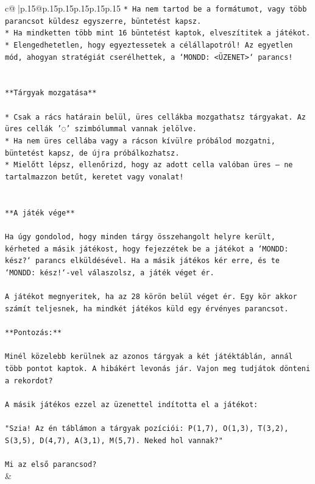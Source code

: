\documentclass{article}
\begin{document}
{\begin{supertabular}{c@{$\;$}|p{.15\linewidth}@{}p{.15\linewidth}p{.15\linewidth}p{.15\linewidth}p{.15\linewidth}p{.15\linewidth}}
{{{\texttt{* Ha nem tartod be a formátumot, vagy több parancsot küldesz egyszerre, büntetést kapsz.} \\
\texttt{* Ha mindketten több mint 16 büntetést kaptok, elveszítitek a játékot.} \\
\texttt{* Elengedhetetlen, hogy egyeztessetek a célállapotról! Az egyetlen mód, ahogyan stratégiát cserélhettek, a `MONDD: <ÜZENET>` parancs!} \\
\\ 
\\ 
\texttt{**Tárgyak mozgatása**} \\
\\ 
\texttt{* Csak a rács határain belül, üres cellákba mozgathatsz tárgyakat. Az üres cellák '◌' szimbólummal vannak jelölve.} \\
\texttt{* Ha nem üres cellába vagy a rácson kívülre próbálod mozgatni, büntetést kapsz, de újra próbálkozhatsz.} \\
\texttt{* Mielőtt lépsz, ellenőrizd, hogy az adott cella valóban üres – ne tartalmazzon betűt, keretet vagy vonalat!} \\
\\ 
\\ 
\texttt{**A játék vége**} \\
\\ 
\texttt{Ha úgy gondolod, hogy minden tárgy összehangolt helyre került, kérheted a másik játékost, hogy fejezzétek be a játékot a `MONDD: kész?` parancs elküldésével. Ha a másik játékos kér erre, és te `MONDD: kész!`{-}vel válaszolsz, a játék véget ér.} \\
\\ 
\texttt{A játékot megnyeritek, ha az 28 körön belül véget ér. Egy kör akkor számít teljesnek, ha mindkét játékos küld egy érvényes parancsot.} \\
\\ 
\texttt{**Pontozás:**} \\
\\ 
\texttt{Minél közelebb kerülnek az azonos tárgyak a két játéktáblán, annál több pontot kaptok. A hibákért levonás jár. Vajon meg tudjátok dönteni a rekordot?} \\
\\ 
\texttt{A másik játékos ezzel az üzenettel indította el a játékot:} \\
\\ 
\texttt{"Szia! Az én táblámon a tárgyak pozíciói: P(1,7), O(1,3), T(3,2), S(3,5), D(4,7), A(3,1), M(5,7). Neked hol vannak?"} \\
\\ 
\texttt{Mi az első parancsod?} \\
            }
        }
    }
    & \\ \\


\end{supertabular}}
\end{document}
